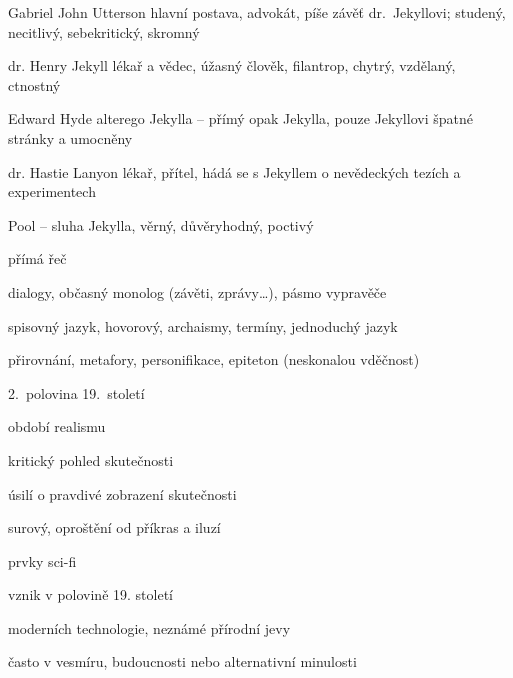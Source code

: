 {\newpart

\begin{compactdesc}
	\item[Gabriel John Utterson] hlavní postava, advokát, píše závěť
		dr.~Jekyllovi; studený, necitlivý, sebekritický, skromný
	\item[dr. Henry Jekyll] lékař a vědec, úžasný člověk, filantrop, chytrý,
		vzdělaný, ctnostný
	\item[Edward Hyde] alterego Jekylla – přímý opak Jekylla, pouze Jekyllovi
		špatné stránky a umocněny
	\item[dr. Hastie Lanyon] lékař, přítel, hádá se s Jekyllem o nevědeckých
		tezích a experimentech 
	\item[Pool] – sluha Jekylla, věrný, důvěryhodný, poctivý
\end{compactdesc}


přímá řeč

dialogy, občasný monolog (závěti, zprávy\dots), pásmo vypravěče

\newpart

spisovný jazyk, hovorový, archaismy, termíny, jednoduchý jazyk


přirovnání, metafory, personifikace, epiteton (neskonalou vděčnost)

\begin{compactitem}
	\item 2.~polovina 19.~století
	\item období realismu
		\begin{compactitem}
			\item kritický pohled skutečnosti
			\item úsilí o pravdivé zobrazení skutečnosti
			\item surový, oproštění od příkras a iluzí
		\end{compactitem}
	\item prvky sci-fi
		\begin{compactitem}
			\item vznik v polovině 19. století
			\item moderních technologie, neznámé přírodní jevy
			\item často v vesmíru, budoucnosti nebo alternativní minulosti
		\end{compactitem}
\end{compactitem}

}
